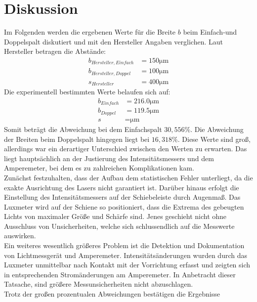 \section{Diskussion}
\label{sec:Diskussion}

Im Folgenden werden die ergebenen Werte für die Breite $b$ beim Einfach-und 
Doppelspalt diskutiert und mit den Hersteller Angaben verglichen. Laut Hersteller
betragen die Abstände:
\begin{align*}
    b_{Hersteller,Einfach} &= 150 \unit{\micro\meter} \\
    b_{Hersteller,Doppel}  &= 100 \unit{\micro\meter} \\
    s_{Hersteller}         &= 400 \unit{\micro\meter}
\end{align*}
\noindent Die experimentell bestimmten Werte belaufen sich auf:
\begin{align*}
    b_{Einfach} &= 216.0 \unit{\micro\meter} \\
    b_{Doppel}  &= 119.5 \unit{\micro\meter} \\
    s           &=  \unit{\micro\meter}
\end{align*}
\noindent Somit beträgt die Abweichung bei dem Einfachspalt $30,556 \%$. Die 
Abweichung der Breiten beim Doppelspalt hingegen liegt bei $16,318 \%$. Diese 
Werte sind groß, allerdings war ein derartiger Unterschied zwischen den Werten 
zu erwarten. Das liegt hauptsächlich an der Justierung des Intensitätsmessers 
und dem Amperemeter, bei dem es zu zahlreichen Komplikationen kam. 
\\
\noindent Zunächst
festzuhalten, dass der Aufbau dem statistischen Fehler unterliegt, da die
exakte Ausrichtung des Lasers nicht garantiert ist. Darüber hinaus erfolgt 
die Einstellung des Intensitätsmessers auf der Schiebeleiste durch Augenmaß. 
Das Luxmeter wird auf der Schiene so positioniert, dass die Extrema des 
gebeugten Lichts von maximaler Größe und Schärfe sind. Jenes geschieht nicht 
ohne Ausschluss von Unsicherheiten, welche sich schlussendlich auf die 
Messwerte auswirken.
\\
\noindent Ein weiteres wesentlich größeres Problem ist die Detektion und 
Dokumentation von Lichtmessgerät und Amperemeter. Intensitätsänderungen
wurden durch das Luxmeter unmittelbar nach Kontakt mit der Vorrichtung
erfasst und zeigten sich in entsprechenden Stromänderungen am Amperemeter.
In Anbetracht dieser Tatsache, sind größere Messunsicherheiten nicht abzuschlagen.
\\
\noindent Trotz der großen prozentualen Abweichungen bestätigen die Ergebnisse

